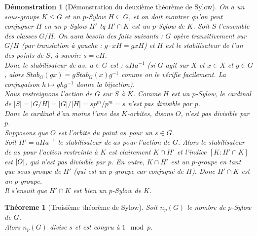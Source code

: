 \documentclass[a4paper, oneside]{report}
\theoremstyle{break}
\newtheorem{thm}{Théoreme}[section] %
\newtheorem*{demonstration}{Démonstration}
\newcommand{\sg}{sous-groupe }
\DeclarePairedDelimiter\abs{\lvert}{\rvert}%
\begin{document}
\begin{demonstration}[Démonstration du deuxième théorème de Sylow]
On a un sous-groupe $K \leq G$ et un $p$-Sylow $H \subseteq G$, et on doit montrer qu'on peut conjuguer $H$ en un $p$-Sylow $H'$ tq $H' \cap K$ est un $p$-Sylow de $K$.
\medbreak
Soit $S$ l'ensemble des classes $G/H$. On aura besoin des faits suivants : $G$ opère transitivement sur $G/H$ (par translation à gauche : $g\cdot xH = gxH$) et $H$ est le stabilisateur de l'un des points de $S$, à savoir: $s = eH$.\\
Donc le stabilisateur de $as, \; a \in G$ est : $aHa^{-1}$ (si $G$ agit sur $X$ et $x\in X$ et $g\in G$, alors $Stab_G(gx)=gStab_G(x)g^{-1}$ comme on le vérifie facilement. La conjugaison $h\mapsto ghg^{-1}$ donne la bijection).\\
Nous restreignons l'action de $G$ sur $S$ à $K$. Comme $H$ est un $p$-Sylow, le cardinal de $|S| = |G/H| = |G|/|H| = sp^m / p^m = s$ n'est pas divisible par $p$.\\
Donc le cardinal d'au moins l'une des $K$-orbites, disons $O$, n'est pas divisible par $p$.\\
Supposons que $O$ est l'orbite du point $as$ pour un $s \in G$.\\
Soit $H' = aHa^{-1}$ le stabilisateur de $as$ pour l'action de $G$. Alors le stabilisateur de $as$ pour l'action restreinte à $K$ est clairement $K \cap H'$ et l'indice $[K : H' \cap K]$ est $\abs{O}$, qui n'est pas divisible par $p$. En outre, $K\cap H'$ est un $p$-groupe en tant que \sg de $H'$ (qui est un $p$-groupe car conjugu\'e de $H$). Donc $H' \cap K$ est un $p$-groupe.\\
Il s'ensuit que $H' \cap K$ est bien un $p$-Sylow de $K$.
\end{demonstration}

\begin{thm}[Troisième théorème de Sylow]
Soit $n_p(G)$ le nombre de $p$-Sylow de $G$.\\
Alors $n_p(G)$ divise $s$ et est congru à $1\mod p$.
\end{thm}
\end{document}
